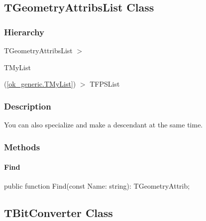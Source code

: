 \documentclass{report}
\newif\ifpdf
\begin{document}
\subsection*{TGeometryAttribsList Class}
\fi
\label{ok_generic.TGeometryAttribsList}
\subsubsection*{\large{\textbf{Hierarchy}}\normalsize\hspace{1ex}\hfill}
TGeometryAttribsList {$>$} \begin{ttfamily}TMyList\end{ttfamily}(\ref{ok_generic.TMyList}) {$>$} 
TFPSList
\subsubsection*{\large{\textbf{Description}}\normalsize\hspace{1ex}\hfill}
You can also specialize and make a descendant at the same time.\subsubsection*{\large{\textbf{Methods}}\normalsize\hspace{1ex}\hfill}
\paragraph*{Find}\hspace*{\fill}

\label{ok_generic.TGeometryAttribsList-Find}
\begin{list}{}{
\setlength{\itemindent}{0cm}
\setlength{\listparindent}{0cm}
\setlength{\leftmargin}{\evensidemargin}
\addtolength{\leftmargin}{\tmplength}
\settowidth{\labelsep}{X}
\addtolength{\leftmargin}{\labelsep}
\setlength{\labelwidth}{\tmplength}
}
\item[\textbf{Declaration}\hfill]
\ifpdf
\begin{flushleft}
\fi
\begin{ttfamily}
public function Find(const Name: string): TGeometryAttrib;\end{ttfamily}

\ifpdf
\end{flushleft}
\fi

\end{list}
\ifpdf
\subsection*{\large{\textbf{TBitConverter Class}}\normalsize\hspace{1ex}\hrulefill}
\else
\end{document}
